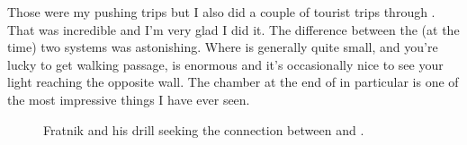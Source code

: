 Those were my pushing trips but I also did a couple of tourist trips through . That was incredible and I’m very glad I did it. The difference between the (at the time) two systems was astonishing. Where  is generally quite small, and you’re lucky to get walking passage,  is enormous and it's occasionally nice to see your light reaching the opposite wall. The chamber at the end of  in particular is one of the most impressive things I have ever seen.


\begin{figure}
\checkoddpage \ifoddpage \forcerectofloat \else \forceversofloat \fi
\centering
 \caption{Fratnik and his drill seeking the connection between  and . }
 \label{m2 drill}
\end{figure}



